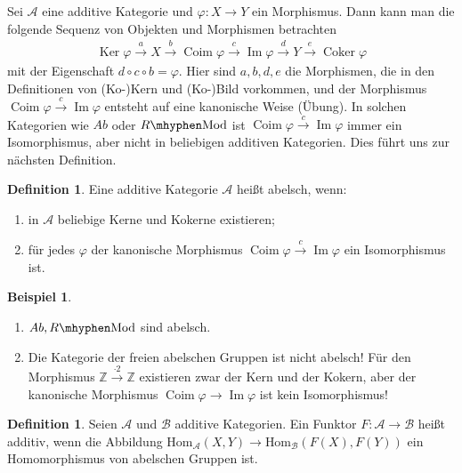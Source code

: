 \documentclass[reqno,12pt]{article}
\numberwithin{equation}{section}
\newcommand{\bZ}{\mathbb{Z}}
\newcommand{\cA}{\mathcal{A}}
\newcommand{\cB}{\mathcal{B}}
\newcommand{\Hom}{\text{Hom}}
\newcommand{\Ker}{\text{Ker }}
\renewcommand{\Im}{\text{Im }}
\theoremstyle{plain}
\theoremstyle{definition}
\newtheorem{definition}[thm]{Definition}
\newtheorem{example}[thm]{Beispiel}
\renewcommand{\Ker}{\operatorname{Ker}}
\renewcommand{\Im}{\operatorname{Im}}
\newcommand{\Coker}{\operatorname{Coker}}
\newcommand{\Coim}{\operatorname{Coim}}
\newcommand{\Mod}{\text{Mod}}
\begin{document}
\bigskip

\noindent Sei $\cA$ eine additive Kategorie und $\varphi \colon X \to Y$ ein Morphismus. Dann kann man die folgende Sequenz von Objekten und Morphismen betrachten
\begin{align*}
\Ker \varphi \overset{a}{\to} X \overset{b}{\to} \Coim \varphi \overset{c}{\to} \Im \varphi \overset{d}{\to} Y \overset{e}{\to} \Coker \varphi
\end{align*}
mit der Eigenschaft $d \circ c \circ b = \varphi$. Hier sind $a,b,d,e$ die Morphismen, die in den Definitionen von (Ko-)Kern und (Ko-)Bild vorkommen, und der Morphismus $\Coim \varphi \overset{c}{\to} \Im \varphi$ entsteht auf eine kanonische Weise (Übung). In solchen Kategorien wie $Ab$ oder $R \mhyphen \Mod$ ist $\Coim \varphi \overset{c}{\to} \Im \varphi$ immer ein Isomorphismus, aber nicht in beliebigen additiven Kategorien. Dies führt uns zur nächsten Definition.



\begin{definition}
Eine additive Kategorie $\cA$ heißt {\sf abelsch}, wenn:
\begin{enumerate}
  \item in $\cA$ beliebige Kerne und Kokerne existieren;
  \item für jedes $\varphi$ der kanonische Morphismus $\Coim \varphi \overset{c}{\to} \Im \varphi$ ein Isomorphismus ist.
\end{enumerate}




\end{definition}

\begin{example}
\
\begin{enumerate}
  \item $Ab, R \mhyphen \Mod$ sind abelsch.
  \item Die Kategorie der freien abelschen Gruppen ist nicht abelsch! Für den Morphismus $\bZ \overset{\cdot 2}{\to} \bZ$ existieren zwar der Kern und der Kokern, aber der kanonische Morphismus $\Coim \varphi \to \Im \varphi$ ist kein Isomorphismus!
\end{enumerate}
\end{example}

\begin{definition}
Seien $\cA$ und $\cB$ additive Kategorien. Ein Funktor $F \colon \cA \to \cB$ heißt {\sf additiv}, wenn die Abbildung
$\Hom_{\cA}(X,Y) \to \Hom_{\cB}(F(X), F(Y))$ ein Homomorphismus von abelschen Gruppen ist.
\end{definition}
\end{document}
